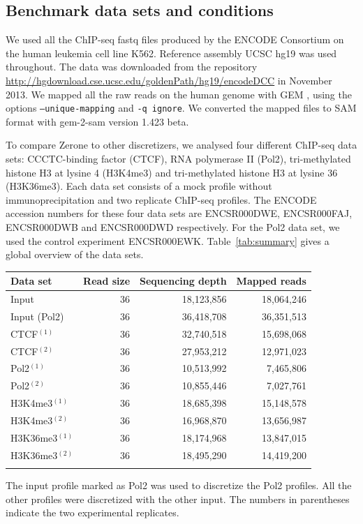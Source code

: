 \documentclass{bioinfo}
\begin{document}
\begin{methods}
\subsection{Benchmark data sets and conditions}
\label{sub:bench_cond}
We used all the ChIP-seq fastq files produced by the ENCODE Consortium
on the human leukemia cell line K562. Reference assembly UCSC hg19 was
used throughout. The data was downloaded from the repository
\href{http://hgdownload.cse.ucsc.edu/goldenPath/hg19/encodeDCC}{http://hgdownload.cse.ucsc.edu/goldenPath/hg19/encodeDCC} in November 2013.
We mapped all the raw reads on the human genome with
GEM \citep[gem-mapper version 1.376 beta, gem-indexer version
1.423 beta,][]{pmid23103880}, using the options \texttt{--unique-mapping} and
\texttt{-q ignore}. We converted the mapped files to SAM format with
gem-2-sam version 1.423 beta.

To compare Zerone to other discretizers, we analysed four different
ChIP-seq data sets: CCCTC-binding factor (CTCF), RNA polymerase II
(Pol2), tri-methylated histone H3 at lysine 4 (H3K4me3)
and tri-methylated histone H3 at lysine 36 (H3K36me3).
Each data set consists of a mock profile without immunoprecipitation
and two replicate ChIP-seq profiles.
The ENCODE accession numbers for these four data sets are
ENCSR000DWE, ENCSR000FAJ, ENCSR000DWB and ENCSR000DWD respectively.
For the Pol2 data set, we used the control experiment ENCSR000EWK.
Table~\ref{tab:summary} gives a global overview of the data sets.

\begin{table}[!tbp]
{\begin{tabular}{lrrr}
        \toprule
        \textbf{Data set} & \textbf{Read size} &
        \textbf{Sequencing depth} & \textbf{Mapped reads} \\
        \midrule
        Input            & 36 & 18,123,856 & 18,064,246 \\
        Input (Pol2)     & 36 & 36,418,708 & 36,351,513 \\
        CTCF$^{(1)}$     & 36 & 32,740,518 & 15,698,068 \\
        CTCF$^{(2)}$     & 36 & 27,953,212 & 12,971,023 \\
        Pol2$^{(1)}$     & 36 & 10,513,992 &  7,465,806 \\
        Pol2$^{(2)}$     & 36 & 10,855,446 &  7,027,761 \\
        H3K4me3$^{(1)}$  & 36 & 18,685,398 & 15,148,578 \\
        H3K4me3$^{(2)}$  & 36 & 16,968,870 & 13,656,987 \\
        H3K36me3$^{(1)}$ & 36 & 18,174,968 & 13,847,015 \\
        H3K36me3$^{(2)}$ & 36 & 18,495,290 & 14,419,200 \\
        \botrule
\end{tabular}}{The input profile marked as Pol2 was used to discretize the
Pol2 profiles. All the other profiles were discretized with the other input.
The numbers in parentheses indicate the two experimental replicates.}
\end{table}


\end{methods}
\end{document}
